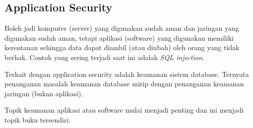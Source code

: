 \subsection{Application Security}
Boleh jadi komputer (server) yang digunakan sudah aman dan jaringan yang
digunakan sudah aman, tetapi aplikasi (software) yang digunakan memiliki
kerentanan sehingga data dapat diambil (atau diubah) oleh orang yang tidak
berhak. Contoh yang sering terjadi saat ini adalah {\em SQL injection}.

Terkait dengan application security adalah keamanan sistem database.
Ternyata penanganan masalah keamanan database mirip dengan penanganan keamanan
jaringan (bukan aplikasi).

Topik keamanan aplikasi atau software mulai menjadi penting dan ini menjadi
topik buku tersendiri.
